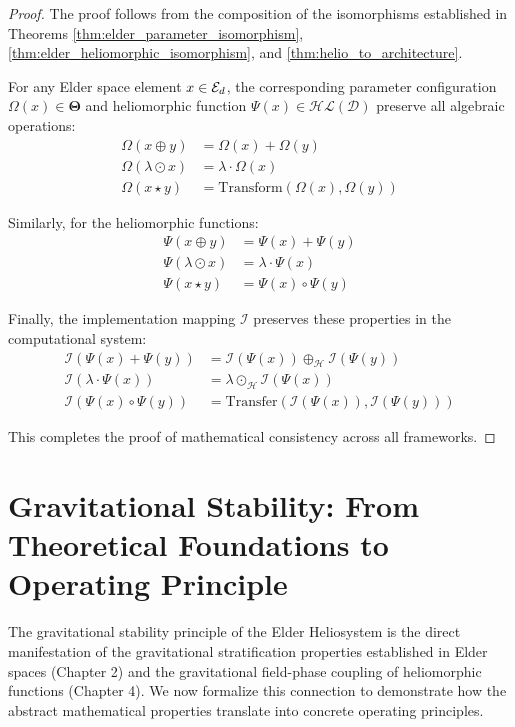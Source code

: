 \begin{proof}
The proof follows from the composition of the isomorphisms established in Theorems \ref{thm:elder_parameter_isomorphism}, \ref{thm:elder_heliomorphic_isomorphism}, and \ref{thm:helio_to_architecture}. 

For any Elder space element $x \in \mathcal{E}_{d}$, the corresponding parameter configuration $\Omega(x) \in \boldsymbol{\Theta}$ and heliomorphic function $\Psi(x) \in \mathcal{HL}(\mathcal{D})$ preserve all algebraic operations:
\begin{align}
\Omega(x \oplus y) &= \Omega(x) + \Omega(y)\\
\Omega(\lambda \odot x) &= \lambda \cdot \Omega(x)\\
\Omega(x \star y) &= \text{Transform}(\Omega(x), \Omega(y))
\end{align}

Similarly, for the heliomorphic functions:
\begin{align}
\Psi(x \oplus y) &= \Psi(x) + \Psi(y)\\
\Psi(\lambda \odot x) &= \lambda \cdot \Psi(x)\\
\Psi(x \star y) &= \Psi(x) \circ \Psi(y)
\end{align}

Finally, the implementation mapping $\mathcal{I}$ preserves these properties in the computational system:
\begin{align}
\mathcal{I}(\Psi(x) + \Psi(y)) &= \mathcal{I}(\Psi(x)) \oplus_{\mathcal{H}} \mathcal{I}(\Psi(y))\\
\mathcal{I}(\lambda \cdot \Psi(x)) &= \lambda \odot_{\mathcal{H}} \mathcal{I}(\Psi(x))\\
\mathcal{I}(\Psi(x) \circ \Psi(y)) &= \text{Transfer}(\mathcal{I}(\Psi(x)), \mathcal{I}(\Psi(y)))
\end{align}

This completes the proof of mathematical consistency across all frameworks.
\end{proof}

\section{Gravitational Stability: From Theoretical Foundations to Operating Principle}

The gravitational stability principle of the Elder Heliosystem is the direct manifestation of the gravitational stratification properties established in Elder spaces (Chapter 2) and the gravitational field-phase coupling of heliomorphic functions (Chapter 4). We now formalize this connection to demonstrate how the abstract mathematical properties translate into concrete operating principles.

